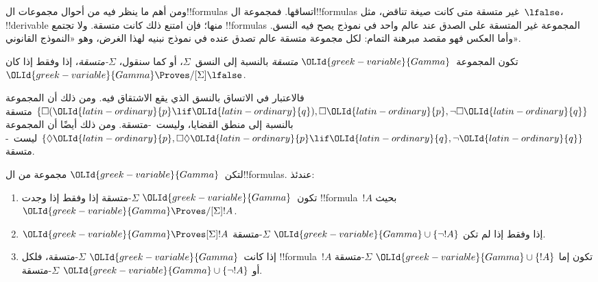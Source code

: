 \documentclass[../../../include/open-logic-section]{subfiles}
\begin{document}


ومن أهم ما ينظر فيه من أحوال مجموعات ال!!{formula}s اتساقها.
فمجموعة ال!!{formula}s غير متسقة متى كانت صيغة تناقض،
مثل~$\lfalse$، !!{derivable} منها؛ فإن امتنع ذلك كانت متسقة.
ولا تجتمع !!{formula}s المجموعة غير المتسقة على الصدق عند عالم واحد
في نموذج يصح فيه النسق. وأما العكس فهو مقصد مبرهنة التمام:
لكل مجموعة متسقة عالم تصدق عنده في نموذج نبنيه لهذا الغرض،
وهو «النموذج القانوني».

\begin{defn}
  تكون المجموعة~$\OLId{greek-variable}{Gamma}$ \emph{متسقة} بالنسبة إلى النسق~$\Sigma$، أو
  كما سنقول، \emph{$\Sigma$-متسقة}، إذا وفقط إذا كان
  $\OLId{greek-variable}{Gamma} \Proves/[\Sigma] \lfalse$.
\end{defn}

فالاعتبار في الاتساق بالنسق الذي يقع الاشتقاق فيه. ومن ذلك أن المجموعة
$\{\Box(\OLId{latin-ordinary}{p} \lif \OLId{latin-ordinary}{q}), \Box \OLId{latin-ordinary}{p}, \lnot\Box \OLId{latin-ordinary}{q}\}$ متسقة بالنسبة إلى منطق القضايا،
وليست~-متسقة. ومن ذلك أيضًا أن المجموعة
$\{\Diamond \OLId{latin-ordinary}{p}, \Box\Diamond \OLId{latin-ordinary}{p} \lif \OLId{latin-ordinary}{q}, \lnot \OLId{latin-ordinary}{q}\}$
ليست~-متسقة.

\begin{prop}
  لتكن~$\OLId{greek-variable}{Gamma}$ مجموعة من ال!!{formula}s. عندئذ:
  \begin{enumerate}
  \item تكون~$\OLId{greek-variable}{Gamma}$ $\Sigma$-متسقة إذا وفقط إذا وجدت
    !!{formula}~$!A$ بحيث~$\OLId{greek-variable}{Gamma} \Proves/[\Sigma] !A$.
  \item {}%
    $\OLId{greek-variable}{Gamma} \Proves[\Sigma] !A$ إذا وفقط إذا لم تكن
    $\OLId{greek-variable}{Gamma} \cup \{\lnot!A\}$ $\Sigma$-متسقة.
  \item {}%
    إذا كانت~$\OLId{greek-variable}{Gamma}$ $\Sigma$-متسقة، فلكل !!{formula}~$!A$ تكون إما
    $\OLId{greek-variable}{Gamma} \cup \{!A\}$ $\Sigma$-متسقة أو
    $\OLId{greek-variable}{Gamma} \cup \{\lnot!A\}$ $\Sigma$-متسقة.
  \end{enumerate}
\end{prop}
\end{document}

